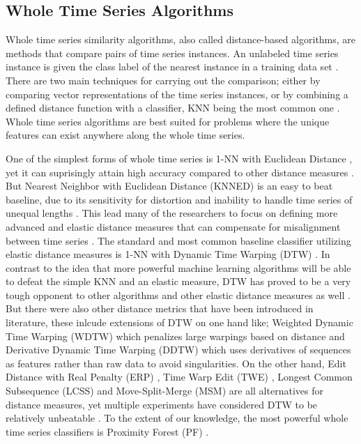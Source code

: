 \subsection{Whole Time Series Algorithms}
\label{SubsectionWhole}
Whole time series similarity algorithms, also called distance-based algorithms, are methods that compare pairs of time series instances.
An unlabeled time series instance is given the class label of the nearest instance in a training data set \cite{kate2016using}.
There are two main techniques for carrying out the comparison;
either by comparing vector representations of the time series instances,
or by combining a defined distance function with a classifier, KNN being the most common one \cite{lines2018time}.
Whole time series algorithms are best suited for problems where the unique features can exist anywhere along the whole time series\cite{bagnall2017great}.

One of the simplest forms of whole time series is 1-NN with Euclidean Distance \cite{faloutsos1994fast}, yet it can suprisingly attain high accuracy compared to other distance measures \cite{xing2010brief}.
But Nearest Neighbor with Euclidean Distance (KNNED) is an easy to beat baseline, due to its sensitivity for distortion and inability to handle time series of unequal lengths \cite{xing2010brief,kate2016using,lines2018time}.
This lead many of the researchers to focus on defining more advanced and elastic distance measures that can compensate for misalignment between time series \cite{abanda2019review}.
The standard and most common baseline classifier utilizing elastic distance measures is 1-NN with Dynamic Time Warping (DTW) \cite{bagnall2017great}.
In contrast to the idea that more powerful machine learning algorithms will be able to defeat the simple KNN and an elastic measure,
DTW has proved to be a very tough opponent to other algorithms and other elastic distance measures as well \cite{kate2016using,lines2015time,wang2013experimental}.
But there were also other distance metrics that have been introduced in literature, these inlcude extensions of DTW on one hand like; Weighted Dynamic Time Warping (WDTW) which penalizes large warpings based on distance \cite{jeong2011weighted}
and Derivative Dynamic Time Warping (DDTW) \cite{keogh2001derivative,gorecki2013using} which uses derivatives of sequences as features rather than raw data to avoid singularities.
On the other hand, Edit Distance with Real Penalty (ERP) \cite{chen2004marriage}, Time Warp Edit (TWE) \cite{marteau2008time}, Longest Common Subsequence (LCSS) \cite{das1997finding} and Move-Split-Merge (MSM) \cite{stefan2012move}
are all alternatives for distance measures, yet multiple experiments have considered DTW to be relatively unbeatable \cite{bagnall2017great,abanda2019review,bostrom2017shapelet}.
To the extent of our knowledge, the most powerful whole time series classifiers is Proximity Forest (PF) \cite{lucas2019proximity}.

